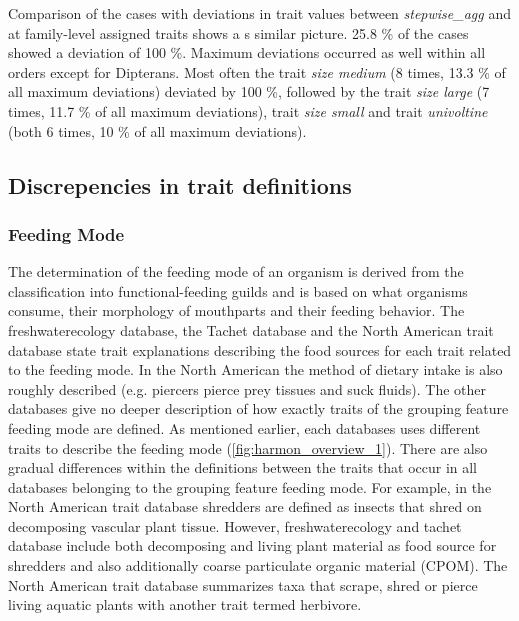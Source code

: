 \documentclass{article}
\begin{document}
Comparison of the cases with deviations in trait values between \textit{stepwise\_agg} and at family-level assigned traits shows a s similar picture. 25.8 \% of the cases showed a deviation of 100 \%. Maximum deviations occurred as well within all orders except for Dipterans. Most often the trait \textit{size medium} (8 times, 13.3 \% of all maximum deviations) deviated by 100 \%, followed by the trait \textit{size large} (7 times, 11.7 \% of all maximum deviations), trait \textit{size small} and trait \textit{univoltine} (both 6 times, 10 \% of all maximum deviations).




\subsection{Discrepencies in trait definitions}

\subsubsection{Feeding Mode}
The determination of the feeding mode of an organism is derived from the classification into functional-feeding guilds and is based on what organisms consume, their morphology of mouthparts and their feeding behavior. %
The freshwaterecology database, the Tachet database and the North American trait database state trait explanations describing the food sources for each trait related to the feeding mode. In the North American the method of dietary intake is also roughly described (e.g. piercers pierce prey tissues and suck fluids). The other databases give no deeper description of how exactly traits of the grouping feature feeding mode are defined.
As mentioned earlier, each databases uses different traits to describe the feeding mode (\ref{fig:harmon_overview_1}). There are also gradual differences within the definitions between the traits that occur in all databases belonging to the grouping feature feeding mode. For example, in the North American trait database shredders are defined as insects that shred on decomposing vascular plant tissue. However, freshwaterecology and tachet database include both decomposing and living plant material as food source for shredders and also additionally coarse particulate organic material (CPOM). The North American trait database summarizes taxa that scrape, shred or pierce living aquatic plants with another trait termed herbivore.
\end{document}
